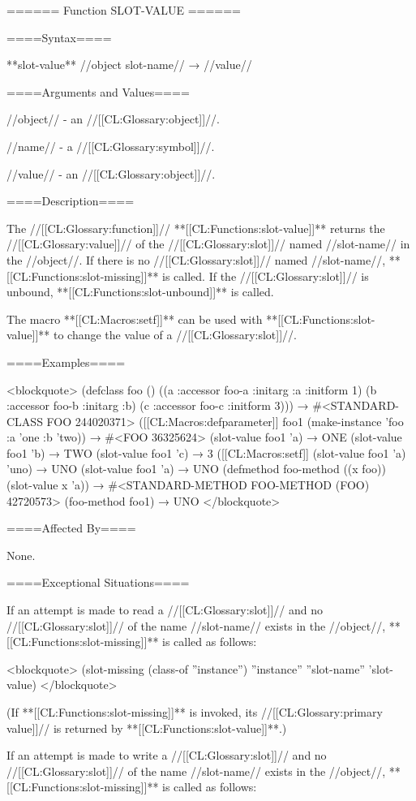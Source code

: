 ====== Function SLOT-VALUE ======

====Syntax====

**{slot-value}** //object slot-name// → //value//

====Arguments and Values====

//object// - an //[[CL:Glossary:object]]//.

//name// - a //[[CL:Glossary:symbol]]//.

//value// - an //[[CL:Glossary:object]]//.

====Description====

The //[[CL:Glossary:function]]// **[[CL:Functions:slot-value]]** returns the //[[CL:Glossary:value]]// of the //[[CL:Glossary:slot]]// named //slot-name// in the //object//. If there is no //[[CL:Glossary:slot]]// named //slot-name//, **[[CL:Functions:slot-missing]]** is called. If the //[[CL:Glossary:slot]]// is unbound, **[[CL:Functions:slot-unbound]]** is called.


The macro **[[CL:Macros:setf]]** can be used with **[[CL:Functions:slot-value]]** to change the value of a //[[CL:Glossary:slot]]//.

====Examples====

<blockquote> (defclass foo () ((a :accessor foo-a :initarg :a :initform 1) (b :accessor foo-b :initarg :b) (c :accessor foo-c :initform 3))) → #<STANDARD-CLASS FOO 244020371> ([[CL:Macros:defparameter]] foo1 (make-instance 'foo :a 'one :b 'two)) → #<FOO 36325624> (slot-value foo1 'a) → ONE (slot-value foo1 'b) → TWO (slot-value foo1 'c) → 3 ([[CL:Macros:setf]] (slot-value foo1 'a) 'uno) → UNO (slot-value foo1 'a) → UNO (defmethod foo-method ((x foo)) (slot-value x 'a)) → #<STANDARD-METHOD FOO-METHOD (FOO) 42720573> (foo-method foo1) → UNO </blockquote>

====Affected By====

None.

====Exceptional Situations====

If an attempt is made to read a //[[CL:Glossary:slot]]// and no //[[CL:Glossary:slot]]// of the name //slot-name// exists in the //object//, **[[CL:Functions:slot-missing]]** is called as follows:

<blockquote> (slot-missing (class-of ''instance'') ''instance'' ''slot-name'' 'slot-value) </blockquote>


(If **[[CL:Functions:slot-missing]]** is invoked, its //[[CL:Glossary:primary value]]// is returned by **[[CL:Functions:slot-value]]**.)

If an attempt is made to write a //[[CL:Glossary:slot]]// and no //[[CL:Glossary:slot]]// of the name //slot-name// exists in the //object//, **[[CL:Functions:slot-missing]]** is called as follows:

